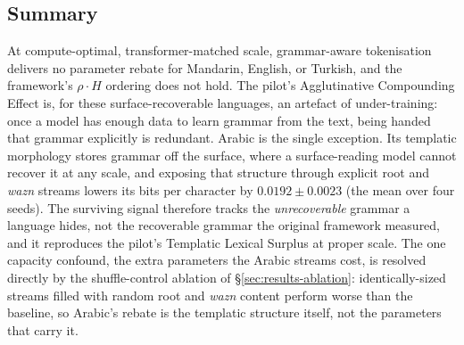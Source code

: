 \subsection{Summary}
\label{sec:results-summary}

At compute-optimal, transformer-matched scale, grammar-aware tokenisation delivers no parameter rebate for Mandarin, English, or Turkish, and the framework's $\rho \cdot H$ ordering does not hold. The pilot's Agglutinative Compounding Effect is, for these surface-recoverable languages, an artefact of under-training: once a model has enough data to learn grammar from the text, being handed that grammar explicitly is redundant. Arabic is the single exception. Its templatic morphology stores grammar off the surface, where a surface-reading model cannot recover it at any scale, and exposing that structure through explicit root and \emph{wazn} streams lowers its bits per character by $0.0192 \pm 0.0023$ (the mean over four seeds). The surviving signal therefore tracks the \emph{unrecoverable} grammar a language hides, not the recoverable grammar the original framework measured, and it reproduces the pilot's Templatic Lexical Surplus at proper scale. The one capacity confound, the extra parameters the Arabic streams cost, is resolved directly by the shuffle-control ablation of \S\ref{sec:results-ablation}: identically-sized streams filled with random root and \emph{wazn} content perform worse than the baseline, so Arabic's rebate is the templatic structure itself, not the parameters that carry it.
